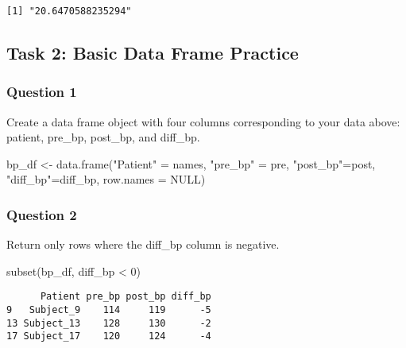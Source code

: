 \documentclass[
  letterpaper,
  DIV=11,
  numbers=noendperiod]{scrartcl}
\newenvironment{Shaded}{\begin{snugshade}}{\end{snugshade}}
\newcommand{\AttributeTok}[1]{\textcolor[rgb]{0.40,0.45,0.13}{#1}}
\newcommand{\ConstantTok}[1]{\textcolor[rgb]{0.56,0.35,0.01}{#1}}
\newcommand{\DecValTok}[1]{\textcolor[rgb]{0.68,0.00,0.00}{#1}}
\newcommand{\FunctionTok}[1]{\textcolor[rgb]{0.28,0.35,0.67}{#1}}
\newcommand{\NormalTok}[1]{\textcolor[rgb]{0.00,0.23,0.31}{#1}}
\newcommand{\OtherTok}[1]{\textcolor[rgb]{0.00,0.23,0.31}{#1}}
\newcommand{\SpecialCharTok}[1]{\textcolor[rgb]{0.37,0.37,0.37}{#1}}
\newcommand{\StringTok}[1]{\textcolor[rgb]{0.13,0.47,0.30}{#1}}
\begin{document}
\begin{verbatim}
[1] "20.6470588235294"
\end{verbatim}

\subsection{Task 2: Basic Data Frame
Practice}\label{task-2-basic-data-frame-practice}

\subsubsection{Question 1}\label{question-1-1}

Create a data frame object with four columns corresponding to your data
above: patient, pre\_bp, post\_bp, and diff\_bp.

\begin{Shaded}
\begin{Highlighting}[]
\NormalTok{bp\_df }\OtherTok{\textless{}{-}} \FunctionTok{data.frame}\NormalTok{(}\StringTok{"Patient"} \OtherTok{=}\NormalTok{ names, }
                    \StringTok{"pre\_bp"} \OtherTok{=}\NormalTok{ pre, }
                    \StringTok{"post\_bp"}\OtherTok{=}\NormalTok{post, }
                    \StringTok{"diff\_bp"}\OtherTok{=}\NormalTok{diff\_bp, }
                    \AttributeTok{row.names =} \ConstantTok{NULL}\NormalTok{)}
\end{Highlighting}
\end{Shaded}

\subsubsection{Question 2}\label{question-2-1}

Return only rows where the diff\_bp column is negative.

\begin{Shaded}
\begin{Highlighting}[]
\FunctionTok{subset}\NormalTok{(bp\_df, diff\_bp }\SpecialCharTok{\textless{}} \DecValTok{0}\NormalTok{)}
\end{Highlighting}
\end{Shaded}

\begin{verbatim}
      Patient pre_bp post_bp diff_bp
9   Subject_9    114     119      -5
13 Subject_13    128     130      -2
17 Subject_17    120     124      -4
\end{verbatim}
\end{document}
